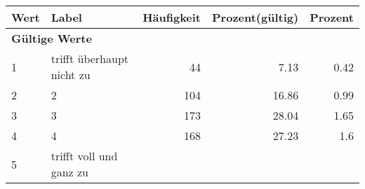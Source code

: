      \begin{longtable}{lXrrr}
     \toprule
     \textbf{Wert} & \textbf{Label} & \textbf{Häufigkeit} & \textbf{Prozent(gültig)} & \textbf{Prozent} \\
     \endhead
     \midrule
     \multicolumn{5}{l}{\textbf{Gültige Werte}}\\

     1 &
     \multicolumn{1}{X}{ trifft überhaupt nicht zu   } &


       \num{44} &
       \num[round-mode=places,round-precision=2]{7.13} &
         \num[round-mode=places,round-precision=2]{0.42} \\

     2 &
     \multicolumn{1}{X}{ 2   } &


       \num{104} &
       \num[round-mode=places,round-precision=2]{16.86} &
         \num[round-mode=places,round-precision=2]{0.99} \\

     3 &
     \multicolumn{1}{X}{ 3   } &


       \num{173} &
       \num[round-mode=places,round-precision=2]{28.04} &
         \num[round-mode=places,round-precision=2]{1.65} \\

     4 &
     \multicolumn{1}{X}{ 4   } &


       \num{168} &
       \num[round-mode=places,round-precision=2]{27.23} &
         \num[round-mode=places,round-precision=2]{1.6} \\

     5 &
     \multicolumn{1}{X}{ trifft voll und ganz zu   } &



\end{longtable}
